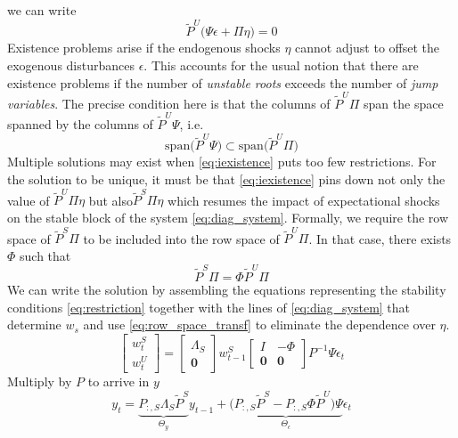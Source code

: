 \documentclass[a4paper,10pt]{article}  %
\begin{document}
we can write
\begin{equation}
   \label{eq:eta_rest_02}
   \tilde{P}^U \Big( \Psi \epsilon + \Pi \eta \Big) = 0
\end{equation}
Existence problems arise if the endogenous shocks $ \eta $ cannot adjust to offset the exogenous disturbances $ \epsilon
$. This accounts for the usual notion that there are existence problems if the number of \emph{unstable roots} exceeds
the number of \emph{jump variables}. The precise condition here is that the columns of $ \tilde{P}^U \Pi $  span the
space spanned by the columns of $ \tilde{P}^U \Psi $, i.e.
\begin{equation}
   \label{eq:iexistence}
   \text{span} \Big( \tilde{P}^U \Psi \Big) \subset \text{span} \Big( \tilde{P}^U \Pi \Big)
\end{equation}
Multiple solutions may exist when \eqref{eq:iexistence} puts too few restrictions. For the solution to be unique, it
must be that \eqref{eq:iexistence} pins down not only the value of $ \tilde{P}^U \Pi \eta $ but also$ \tilde{P}^S \Pi
\eta $ which resumes the impact of expectational shocks on the stable block of the system \eqref{eq:diag_system}.
Formally, we require the row space of $  \tilde{P}^S \Pi  $ to be included into the row space of $ \tilde{P}^U \Pi $.
In that case, there exists $ \Phi $ such that
\begin{equation}
   \label{eq:row_space_transf}
   \tilde{P}^S \Pi = \Phi \tilde{P}^U \Pi
\end{equation}
We can write the solution by assembling the equations representing the stability conditions \eqref{eq:restriction}
together with the lines of \eqref{eq:diag_system} that determine $ w_s $ and use \eqref{eq:row_space_transf} to
eliminate the dependence over $ \eta $.
\begin{equation}
   \label{eq:system1_simul}
   \begin{bmatrix}
      w^S_{t} \\ w^U_{t}
   \end{bmatrix} = 
   \begin{bmatrix}
      \Lambda_S \\ \mathbf{0}
   \end{bmatrix} w^S_{t-1}
   \begin{bmatrix}
      I & -\Phi  \\ \mathbf{0} & \mathbf{0}
   \end{bmatrix}P^{-1} \Psi \epsilon_t
\end{equation}
Multiply by $ P $ to arrive in $ y $
\begin{equation}
   \label{eq:system2_simul}
   y_t = \underbrace{P_{:,S} \Lambda_S \tilde{P}^S}_{ \Theta_y } y_{t-1} + 
         \underbrace{\Big( P_{:,S} \tilde{P}^S - P_{:,S} \Phi \tilde{P}^U \Big) \Psi}
         _{\Theta_{\epsilon}} \epsilon_t
\end{equation}
\end{document}
